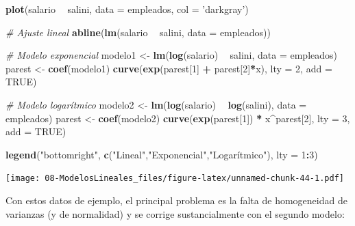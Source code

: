 \documentclass[]{book}
\newenvironment{Shaded}{\begin{snugshade}}{\end{snugshade}}
\newcommand{\CommentTok}[1]{\textcolor[rgb]{0.56,0.35,0.01}{\textit{#1}}}
\newcommand{\DataTypeTok}[1]{\textcolor[rgb]{0.13,0.29,0.53}{#1}}
\newcommand{\DecValTok}[1]{\textcolor[rgb]{0.00,0.00,0.81}{#1}}
\newcommand{\KeywordTok}[1]{\textcolor[rgb]{0.13,0.29,0.53}{\textbf{#1}}}
\newcommand{\NormalTok}[1]{#1}
\newcommand{\OperatorTok}[1]{\textcolor[rgb]{0.81,0.36,0.00}{\textbf{#1}}}
\newcommand{\OtherTok}[1]{\textcolor[rgb]{0.56,0.35,0.01}{#1}}
\newcommand{\StringTok}[1]{\textcolor[rgb]{0.31,0.60,0.02}{#1}}
\begin{document}
\begin{Shaded}
\begin{Highlighting}[]
\KeywordTok{plot}\NormalTok{(salario }\OperatorTok{~}\StringTok{ }\NormalTok{salini, }\DataTypeTok{data =}\NormalTok{ empleados, }\DataTypeTok{col =} \StringTok{'darkgray'}\NormalTok{)}

\CommentTok{# Ajuste lineal}
\KeywordTok{abline}\NormalTok{(}\KeywordTok{lm}\NormalTok{(salario }\OperatorTok{~}\StringTok{ }\NormalTok{salini, }\DataTypeTok{data =}\NormalTok{ empleados)) }

\CommentTok{# Modelo exponencial}
\NormalTok{modelo1 <-}\StringTok{ }\KeywordTok{lm}\NormalTok{(}\KeywordTok{log}\NormalTok{(salario) }\OperatorTok{~}\StringTok{ }\NormalTok{salini, }\DataTypeTok{data =}\NormalTok{ empleados)}
\NormalTok{parest <-}\StringTok{ }\KeywordTok{coef}\NormalTok{(modelo1)}
\KeywordTok{curve}\NormalTok{(}\KeywordTok{exp}\NormalTok{(parest[}\DecValTok{1}\NormalTok{] }\OperatorTok{+}\StringTok{ }\NormalTok{parest[}\DecValTok{2}\NormalTok{]}\OperatorTok{*}\NormalTok{x), }\DataTypeTok{lty =} \DecValTok{2}\NormalTok{, }\DataTypeTok{add =} \OtherTok{TRUE}\NormalTok{)}

\CommentTok{# Modelo logarítmico}
\NormalTok{modelo2 <-}\StringTok{ }\KeywordTok{lm}\NormalTok{(}\KeywordTok{log}\NormalTok{(salario) }\OperatorTok{~}\StringTok{ }\KeywordTok{log}\NormalTok{(salini), }\DataTypeTok{data =}\NormalTok{ empleados)}
\NormalTok{parest <-}\StringTok{ }\KeywordTok{coef}\NormalTok{(modelo2)}
\KeywordTok{curve}\NormalTok{(}\KeywordTok{exp}\NormalTok{(parest[}\DecValTok{1}\NormalTok{]) }\OperatorTok{*}\StringTok{ }\NormalTok{x}\OperatorTok{^}\NormalTok{parest[}\DecValTok{2}\NormalTok{], }\DataTypeTok{lty =} \DecValTok{3}\NormalTok{, }\DataTypeTok{add =} \OtherTok{TRUE}\NormalTok{)}

\KeywordTok{legend}\NormalTok{(}\StringTok{"bottomright"}\NormalTok{, }\KeywordTok{c}\NormalTok{(}\StringTok{"Lineal"}\NormalTok{,}\StringTok{"Exponencial"}\NormalTok{,}\StringTok{"Logarítmico"}\NormalTok{), }\DataTypeTok{lty =} \DecValTok{1}\OperatorTok{:}\DecValTok{3}\NormalTok{)}
\end{Highlighting}
\end{Shaded}

\texttt{[image: 08-ModelosLineales\_files/figure-latex/unnamed-chunk-44-1.pdf]}

Con estos datos de ejemplo, el principal problema es la falta de homogeneidad de varianzas (y de normalidad) y se corrige sustancialmente con el segundo modelo:
\end{document}
